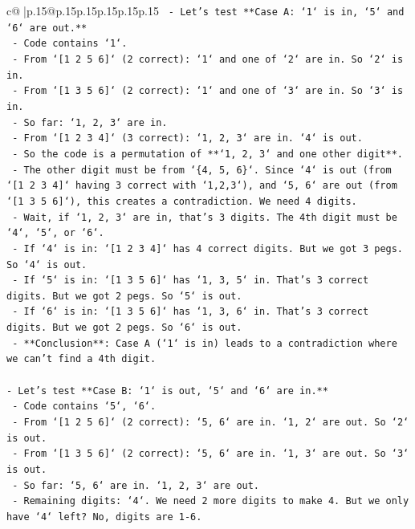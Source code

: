 \documentclass{article}
\begin{document}
{\begin{supertabular}{c@{$\;$}|p{.15\linewidth}@{}p{.15\linewidth}p{.15\linewidth}p{.15\linewidth}p{.15\linewidth}p{.15\linewidth}}
{{{\texttt{    {-} Let's test **Case A: `1` is in, `5` and `6` are out.**} \\
\texttt{        {-} Code contains `1`.} \\
\texttt{        {-} From `{[}1 2 5 6{]}` (2 correct): `1` and one of `2` are in. So `2` is in.} \\
\texttt{        {-} From `{[}1 3 5 6{]}` (2 correct): `1` and one of `3` are in. So `3` is in.} \\
\texttt{        {-} So far: `1, 2, 3` are in.} \\
\texttt{        {-} From `{[}1 2 3 4{]}` (3 correct): `1, 2, 3` are in. `4` is out.} \\
\texttt{        {-} So the code is a permutation of **`1, 2, 3` and one other digit**.} \\
\texttt{        {-} The other digit must be from `\{4, 5, 6\}`. Since `4` is out (from `{[}1 2 3 4{]}` having 3 correct with `1,2,3`), and `5, 6` are out (from `{[}1 3 5 6{]}`), this creates a contradiction. We need 4 digits.} \\
\texttt{        {-} Wait, if `1, 2, 3` are in, that's 3 digits. The 4th digit must be `4`, `5`, or `6`.} \\
\texttt{        {-} If `4` is in: `{[}1 2 3 4{]}` has 4 correct digits. But we got 3 pegs. So `4` is out.} \\
\texttt{        {-} If `5` is in: `{[}1 3 5 6{]}` has `1, 3, 5` in. That's 3 correct digits. But we got 2 pegs. So `5` is out.} \\
\texttt{        {-} If `6` is in: `{[}1 3 5 6{]}` has `1, 3, 6` in. That's 3 correct digits. But we got 2 pegs. So `6` is out.} \\
\texttt{        {-} **Conclusion**: Case A (`1` is in) leads to a contradiction where we can't find a 4th digit.} \\
\\ 
\texttt{{-} Let's test **Case B: `1` is out, `5` and `6` are in.**} \\
\texttt{    {-} Code contains `5`, `6`.} \\
\texttt{    {-} From `{[}1 2 5 6{]}` (2 correct): `5, 6` are in. `1, 2` are out. So `2` is out.} \\
\texttt{    {-} From `{[}1 3 5 6{]}` (2 correct): `5, 6` are in. `1, 3` are out. So `3` is out.} \\
\texttt{    {-} So far: `5, 6` are in. `1, 2, 3` are out.} \\
\texttt{    {-} Remaining digits: `4`. We need 2 more digits to make 4. But we only have `4` left? No, digits are 1{-}6.} \\
}}}
\end{supertabular}}
\end{document}
